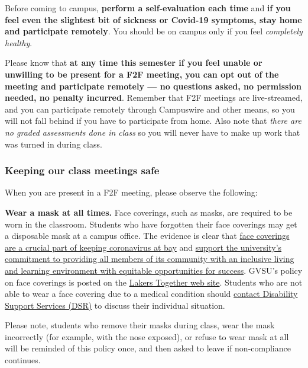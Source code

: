 \documentclass[]{article}
\begin{document}
Before coming to campus, \textbf{perform a self-evaluation each time}
and \textbf{if you feel even the slightest bit of sickness or Covid-19
symptoms, stay home and participate remotely}. You should be on campus
only if you feel \emph{completely healthy}.

Please know that \textbf{at any time this semester if you feel unable or
unwilling to be present for a F2F meeting, you can opt out of the
meeting and participate remotely --- no questions asked, no permission
needed, no penalty incurred}. Remember that F2F meetings are
live-streamed, and you can participate remotely through Campuswire and
other means, so you will not fall behind if you have to participate from
home. Also note that \emph{there are no graded assessments done in
class} so you will never have to make up work that was turned in during
class.

\hypertarget{keeping-our-class-meetings-safe}{%
\subsubsection{Keeping our class meetings
safe}\label{keeping-our-class-meetings-safe}}

When you are present in a F2F meeting, please observe the following:

\textbf{Wear a mask at all times.} Face coverings, such as masks, are
required to be worn in the classroom. Students who have forgotten their
face coverings may get a disposable mask at a campus office. The
evidence is clear that
\href{https://www.wbtv.com/2020/06/29/demonstration-aims-show-effectiveness-masks/}{face
coverings are a crucial part of keeping coronavirus at bay} and
\href{https://www.gvsu.edu/inclusion/suggested-syllabus-language-for-inclusion-and-equity-132.htm}{support
the university's commitment to providing all members of its community
with an inclusive living and learning environment with equitable
opportunities for success}. GVSU's policy on face coverings is posted on
the
\href{https://www.gvsu.edu/lakerstogether/face-covering-policy-27.htm}{Lakers
Together web site}. Students who are not able to wear a face covering
due to a medical condition should
\href{https://www.gvsu.edu/dsr/}{contact Disability Support Services
(DSR)} to discuss their individual situation.

Please note, students who remove their masks during class, wear the mask
incorrectly (for example, with the nose exposed), or refuse to wear mask
at all will be reminded of this policy once, and then asked to leave if
non-compliance continues.
\end{document}
